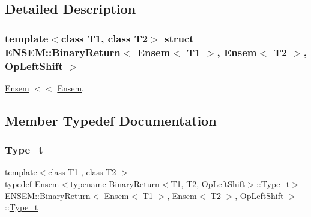 \subsection{Detailed Description}
\subsubsection*{template$<$class T1, class T2$>$\newline
struct E\+N\+S\+E\+M\+::\+Binary\+Return$<$ Ensem$<$ T1 $>$, Ensem$<$ T2 $>$, Op\+Left\+Shift $>$}

\mbox{\hyperlink{classENSEM_1_1Ensem}{Ensem}} $<$$<$ \mbox{\hyperlink{classENSEM_1_1Ensem}{Ensem}}. 

\subsection{Member Typedef Documentation}
\mbox{\label{structENSEM_1_1BinaryReturn_3_01Ensem_3_01T1_01_4_00_01Ensem_3_01T2_01_4_00_01OpLeftShift_01_4_aed9853484e9cd6dbd5752114f8422cd1}} 
\subsubsection{\texorpdfstring{Type\_t}{Type\_t}\hspace{0.1cm}{\footnotesize\ttfamily [1/3]}}
{\footnotesize\ttfamily template$<$class T1 , class T2 $>$ \\
typedef \mbox{\hyperlink{classENSEM_1_1Ensem}{Ensem}}$<$typename \mbox{\hyperlink{structENSEM_1_1BinaryReturn}{Binary\+Return}}$<$T1, T2, \mbox{\hyperlink{structENSEM_1_1OpLeftShift}{Op\+Left\+Shift}}$>$\+::\mbox{\hyperlink{structENSEM_1_1BinaryReturn_3_01Ensem_3_01T1_01_4_00_01Ensem_3_01T2_01_4_00_01OpLeftShift_01_4_aed9853484e9cd6dbd5752114f8422cd1}{Type\+\_\+t}}$>$ \mbox{\hyperlink{structENSEM_1_1BinaryReturn}{E\+N\+S\+E\+M\+::\+Binary\+Return}}$<$ \mbox{\hyperlink{classENSEM_1_1Ensem}{Ensem}}$<$ T1 $>$, \mbox{\hyperlink{classENSEM_1_1Ensem}{Ensem}}$<$ T2 $>$, \mbox{\hyperlink{structENSEM_1_1OpLeftShift}{Op\+Left\+Shift}} $>$\+::\mbox{\hyperlink{structENSEM_1_1BinaryReturn_3_01Ensem_3_01T1_01_4_00_01Ensem_3_01T2_01_4_00_01OpLeftShift_01_4_aed9853484e9cd6dbd5752114f8422cd1}{Type\+\_\+t}}}

